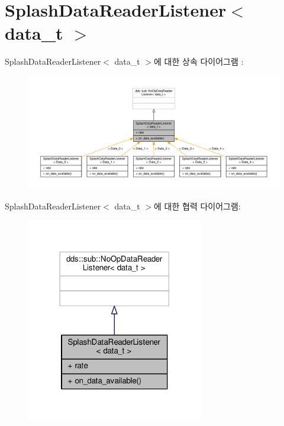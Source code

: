\hypertarget{classSplashDataReaderListener}{}\section{Splash\+Data\+Reader\+Listener$<$ data\+\_\+t $>$}
\label{classSplashDataReaderListener}


Splash\+Data\+Reader\+Listener$<$ data\+\_\+t $>$에 대한 상속 다이어그램 \+: \nopagebreak
\begin{figure}[H]
\begin{center}
\leavevmode
\includegraphics[width=350pt]{classSplashDataReaderListener__inherit__graph}
\end{center}
\end{figure}


Splash\+Data\+Reader\+Listener$<$ data\+\_\+t $>$에 대한 협력 다이어그램\+:\nopagebreak
\begin{figure}[H]
\begin{center}
\leavevmode
\includegraphics[width=218pt]{classSplashDataReaderListener__coll__graph}
\end{center}
\end{figure}
